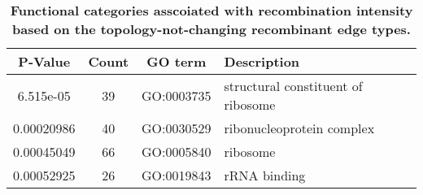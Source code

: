 \documentclass[10pt]{article}
\providecommand{\tabularnewline}{\\}
\begin{document}
\begin{table}[!ht]
\caption{
{\bf Functional categories asscoiated with 
recombination intensity based on the topology-not-changing recombinant edge
types.}}
\noindent \begin{centering}
\begin{tabular}{cccl}
\hline 
P-Value & Count & GO term & Description\tabularnewline
\hline 
6.515e-05 & 39 & GO:0003735 & structural constituent of ribosome\tabularnewline
0.00020986 & 40 & GO:0030529 & ribonucleoprotein complex\tabularnewline
0.00045049 & 66 & GO:0005840 & ribosome\tabularnewline
0.00052925 & 26 & GO:0019843 & rRNA binding\tabularnewline
\hline 
\end{tabular}
\par\end{centering}
\label{tab:functional-notopology}
\end{table}




\end{document}
